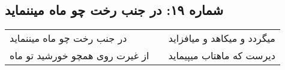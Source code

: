 \begin{center}
\section*{شماره ۱۹: در جنب رخت چو ماه میننماید}
\label{sec:019}
\begin{longtable}{l p{0.5cm} r}
در جنب رخت چو ماه میننماید
&&
میگردد و میکاهد و میافزاید
\\
از غیرت روی همچو خورشید تو ماه
&&
دیرست که ماهتاب میپیماید
\\
\end{longtable}
\end{center}
